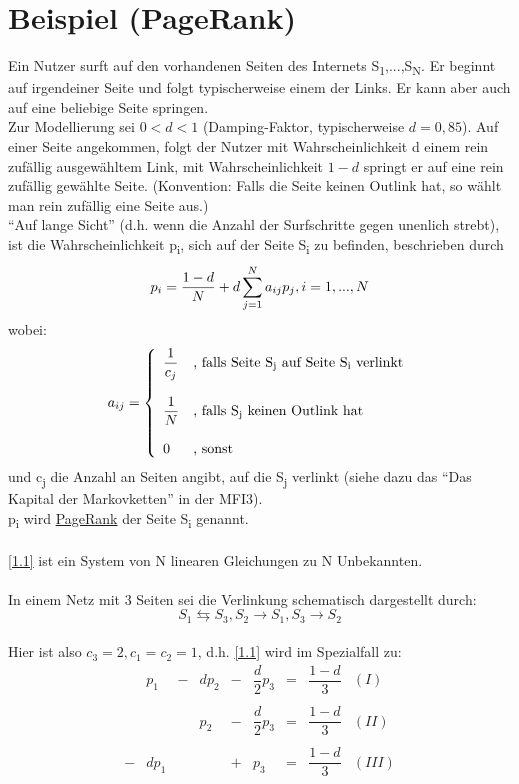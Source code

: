 \documentclass{scrbook}
\begin{document}
\section{Beispiel (PageRank)}
Ein Nutzer surft auf den vorhandenen Seiten des Internets S\textsubscript{1},...,S\textsubscript{N}. Er beginnt auf irgendeiner Seite und folgt typischerweise einem der Links. Er kann aber auch auf eine beliebige Seite springen.\\
Zur Modellierung sei \(0<d<1\) (Damping-Faktor, typischerweise \(d=0,85\)).
Auf einer Seite angekommen, folgt der Nutzer mit Wahrscheinlichkeit d einem rein zufällig ausgewähltem Link, mit Wahrscheinlichkeit \(1-d\) springt er auf eine rein zufällig gewählte Seite.
(Konvention: Falls die Seite keinen Outlink hat, so wählt man rein zufällig eine Seite aus.)\\
"`Auf lange Sicht"' (d.h. wenn die Anzahl der Surfschritte gegen unenlich strebt), ist die Wahrscheinlichkeit p\textsubscript{i}, sich auf der Seite S\textsubscript{i} zu befinden, beschrieben durch
\begin{equation}\text{\label{1.1}}
p_{i} =\dfrac{1-d}{N} + d \sum_{j=1}^{N}a_{ij} p_{j}, i=1,...,N
\end{equation}
wobei:
\[
a_{ij}=
\left\{
\begin{array}{ll}
\dfrac{1}{c_{j}} & \text{, falls Seite S\textsubscript{j} auf Seite S\textsubscript{i} verlinkt}\\
\\
\dfrac{1}{N} & \text{, falls S\textsubscript{j} keinen Outlink hat}\\
\\
0 & \text{, sonst} 
\end{array}
\right.
\]
und c\textsubscript{j} die Anzahl an Seiten angibt, auf die S\textsubscript{j} verlinkt (siehe dazu das "`Das Kapital der Markovketten"' in der MFI3).\\
p\textsubscript{i} wird \uline{PageRank} der Seite S\textsubscript{i} genannt.\\
\\
\ref{1.1} ist ein System von N linearen Gleichungen zu N Unbekannten.\\
\\
In einem Netz mit 3 Seiten sei die Verlinkung schematisch dargestellt durch:\\
\[S_1\leftrightarrows S_3,S_2\rightarrow S_1, S_3 \rightarrow S_2\]
\\
Hier ist also \(c_3=2, c_1=c_2=1\), d.h. \ref{1.1}  
wird im Spezialfall zu:
\[\begin{array}{lrlrlrclc}
&p_1&-&d p_2 &-&\dfrac{d}{2}p_3&=&\dfrac{1-d}{3}&(I)\\\\
&&&p_2&-&\dfrac{d}{2}p_3&=&\dfrac{1-d}{3}&(II)\\\\
-&d p_1&&&+&p_3&=&\dfrac{1-d}{3}&(III)\\\\
\end{array}
\]
\end{document}
